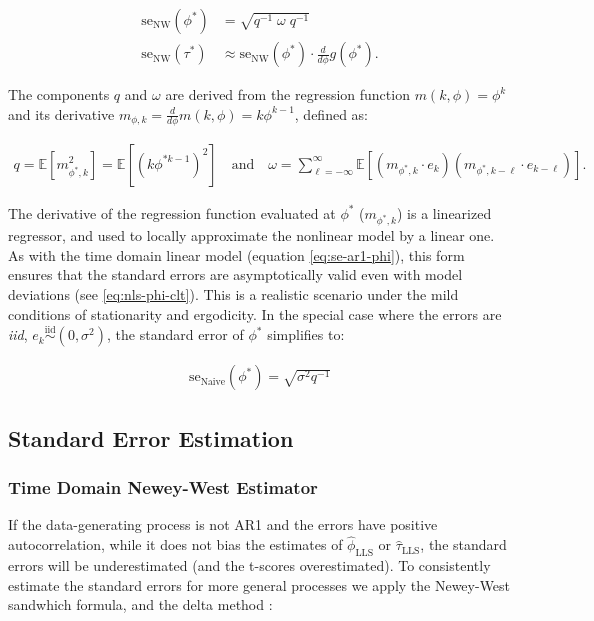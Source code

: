 \documentclass[main.tex]{subfiles}
\begin{document}
\begin{align}
    \text{se}_\text{NW}(\phi^*) &= \sqrt{q^{-1}\; \omega \;q^{-1}}\\
    \text{se}_\text{NW}(\tau^*) &\approx \text{se}_\text{NW}(\phi^*) \cdot \frac{d}{d\phi}g(\phi^*).
\end{align}

\noindent The components $q$ and $\omega$ are derived from the regression function $m(k, \phi) = \phi^k$ and its derivative $m_{\phi, k} = \frac{d}{d\phi} m(k, \phi) = k \phi^{k-1}$, defined as:

\begin{align}
    q = \mathbb{E}[m_{\phi^*, k}^2] = \mathbb{E}[(k \phi^{*k-1})^2] \quad\text{and}\quad
    \omega = \sum_{\ell=-\infty}^{\infty} \mathbb{E}[(m_{\phi^*, k} \cdot e_{k})(m_{\phi^*, k-\ell} \cdot e_{k-\ell})].
\end{align}

The derivative of the regression function evaluated at $\phi^*$ ($m_{\phi^*, k}$) is a linearized regressor, and used to locally approximate the nonlinear model by a linear one. As with the time domain linear model (equation \eqref{eq:se-ar1-phi}), this form ensures that the standard errors are asymptotically valid even with model deviations (see \eqref{eq:nls-phi-clt}). This is a realistic scenario under the mild conditions of stationarity and ergodicity. In the special case where the errors are \textit{iid}, $e_k \overset{\text{iid}}{\sim} (0, \sigma^2)$, the standard error of $\phi^*$ simplifies to:

\begin{align}
    \text{se}_{\text{Naive}}(\phi^*) = \sqrt{\sigma^2 q^{-1}}
\end{align}

\subsection{Standard Error Estimation}
\subsubsection{Time Domain Newey-West Estimator}

If the data-generating process is not AR1 and the errors have positive autocorrelation, while it does not bias the estimates of $\hat\phi_{\scriptscriptstyle\text{LLS}}$ or $\hat\tau_{\scriptscriptstyle\text{LLS}}$, the standard errors will be underestimated (and the t-scores overestimated). To consistently estimate the standard errors for more general processes we apply the Newey-West sandwhich formula, and the delta method \citep{newey_simple_1987}:
\end{document}
